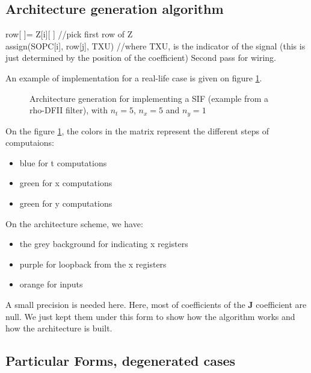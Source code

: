 \subsection{Architecture generation algorithm}

	\begin{algorithm}[H]
	 {
	 	row[ ]= Z[i][ ] //pick first row of Z \\
	 	 {
	 		assign(SOPC[i], row[j], TXU) //where TXU, is the indicator of the signal (this is just determined by the position of the coefficient)
	 	}
		Second pass for wiring.
	}
	\end{algorithm}

	An example of implementation for a real-life case is given on figure \ref{fig:SIFimpl}.

	\begin{figure}[!h]
	\begin{center}
	\scalebox{7}{}
	\end{center}
	\caption{ Architecture generation for implementing a SIF (example from a rho-DFII filter), with $n_t=5$, $n_x=5$ and $n_y=1$ \label{fig:SIFimpl}}
	\end{figure}

	On the figure \ref{fig:SIFimpl}, the colors in the matrix represent the different steps of computaions:
	\begin{itemize}
		\item blue for t computations
		\item green for x computations
		\item green for y computations
	\end{itemize}

	On the architecture scheme, we have:
	\begin{itemize}
		\item the grey background for indicating x registers
		\item purple for loopback from the x registers
		\item orange for inputs
	\end{itemize}
	
	A small precision is needed here.
	Here, most of coefficients of the $\boldsymbol{J}$ coefficient are null.
	We just kept them under this form to show how the algorithm works and how the architecture is built.
	

\subsection{Particular Forms, degenerated cases}
